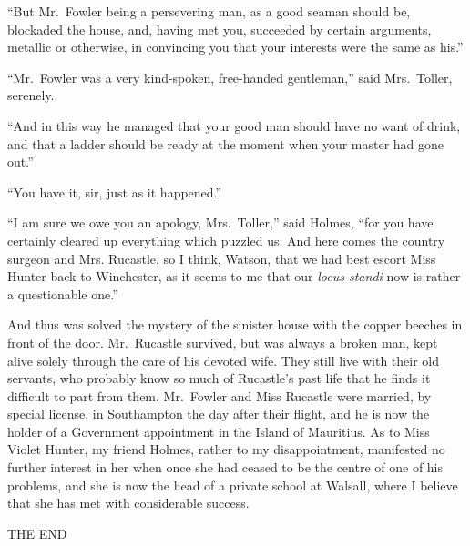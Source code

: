 “But Mr.~Fowler being a persevering man, as a good
seaman should be, blockaded the house, and, having met you,
succeeded by certain arguments, metallic or otherwise, in
convincing you that your interests were the same as his.”

“Mr.~Fowler was a very kind-spoken, free-handed gentleman,”
said Mrs.~Toller, serenely.

“And in this way he managed that your good man should
have no want of drink, and that a ladder should be ready at
the moment when your master had gone out.”

“You have it, sir, just as it happened.”

“I am sure we owe you an apology, Mrs.~Toller,” said
Holmes, “for you have certainly cleared up everything which
puzzled us. And here comes the country surgeon and Mrs.
Rucastle, so I think, Watson, that we had best escort Miss
Hunter back to Winchester, as it seems to me that our \textit{locus
standi} now is rather a questionable one.”

And thus was solved the mystery of the sinister house with
the copper beeches in front of the door. Mr.~Rucastle survived,
but was always a broken man, kept alive solely through
the care of his devoted wife. They still live with their old
servants, who probably know so much of Rucastle’s past life
that he finds it difficult to part from them. Mr.~Fowler and
Miss Rucastle were married, by special license, in Southampton
the day after their flight, and he is now the holder of a
Government appointment in the Island of Mauritius. As to
Miss Violet Hunter, my friend Holmes, rather to my
disappointment, manifested no further interest in her when once
she had ceased to be the centre of one of his problems, and
she is now the head of a private school at Walsall, where I
believe that she has met with considerable success.

THE END
